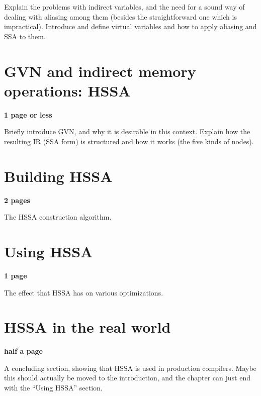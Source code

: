 Explain the problems with indirect variables, and the need for a sound way of dealing with aliasing among them (besides the straightforward one which is impractical).
Introduce and define virtual variables and how to apply aliasing and SSA to them.

\section{GVN and indirect memory operations: HSSA}
\textbf{1 page or less}

Briefly introduce GVN, and why it is desirable in this context.
Explain how the resulting IR (SSA form) is structured and how it works (the five kinds of nodes).

\section{Building HSSA}
\textbf{2 pages}

The HSSA construction algorithm.

\section{Using HSSA}
\textbf{1 page}

The effect that HSSA has on various optimizations.

\section{HSSA in the real world}
\textbf{half a page}

A concluding section, showing that HSSA is used in production compilers.
Maybe this should actually be moved to the introduction, and the chapter can just end with the ``Using HSSA'' section.



